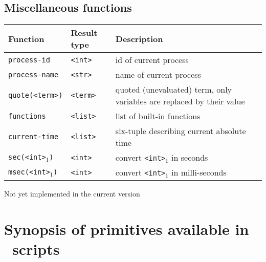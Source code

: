 \subsection{Miscellaneous functions}

\begin{tabular}{|l|l|p{8cm}|} \hline
 Function				& Result type 	& Description \\ \hline
 {\tt process-id}			& {\tt  <int>}   & id of current process \\
 {\tt process-name}			& {\tt  <str>}   & name of current process\\
 {\tt quote(<term>)}			& {\tt  <term>}  & quoted (unevaluated) term,
							   only variables are replaced by their value \\
 {\tt functions}			& {\tt  <list>}  & list of built-in functions\\ \hline
 {\tt current-time}			& {\tt <list>}	 & six-tuple describing current absolute time\\
 {\tt sec(<int>$_1$)}			& {\tt <int>}	 & convert {\tt <int>$_1$} in seconds \\
 {\tt msec(<int>$_1$)}\dag		& {\tt <int>}	 & convert {\tt <int>$_1$} in milli-seconds\\ \hline
\end{tabular}

\vspace{\baselineskip}
\noindent \dag Not yet implemented in the current version
\newpage


\section{Synopsis of primitives available in \T\ scripts}

